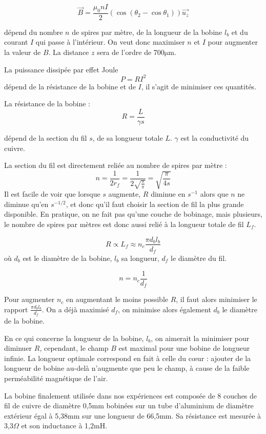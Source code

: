 \documentclass{report}
\newcommand{\micro}{$\mathrm{\mu}$}
\begin{document}
		$$ \vec{B} = \frac{\mu_0 n I}{2} \left(\cos \left(\theta_2 -\cos \theta_1 \right)\right) \vec{u_z}$$
		
		dépend du nombre $n$ de spires par mètre, de la longueur de la bobine $l_b$ et du courant $I$ qui passe à l'intérieur. On veut donc maximiser $n$ et $I$ pour augmenter la valeur de $B$. La distance $z$ sera de l'ordre de 700\micro m. 
		
		La puissance dissipée par effet Joule $$P = R I^2$$ dépend de la résistance de la bobine et de $I$, il s'agit de minimiser ces quantités.
		
		La résistance de la bobine : $$R = \frac{L}{\gamma s}$$
		
		dépend de la section du fil $s$, de sa longueur totale $L$. $\gamma$ est la conductivité du cuivre.  
		
		La section du fil est directement reliée au nombre de spires par mètre : $$ n = \frac{1}{2r_f} = \frac{1}{2 \sqrt{\frac{s}{\pi}}} = \sqrt{\frac{\pi}{4s}}$$  Il est facile de voir que lorsque $s$ augmente, $R$ diminue en $s^{-1}$ alors que $n$ ne diminue qu'en $s^{-1/2}$, et donc qu'il faut choisir la section de fil la plus grande disponible.
		En pratique, on ne fait pas qu'une couche de bobinage, mais plusieurs, le nombre de spires par mètres est donc aussi relié à la longueur totale de fil $L_f$.
		
		$$R \propto L_f \approx n_c \frac{\pi d_b l_b}{d_f}$$ où $d_b$ est le diamètre de la bobine, $l_b$ sa longueur, $d_f$ le diamètre du fil. 
		
		$$n = n_c \frac{1}{d_f}$$
		
		Pour augmenter $n_c$ en augmentant le moins possible $R$, il faut alors minimiser le rapport $\frac{\pi d_b l_b}{d_f}$. On a déjà maximisé $d_f$, on minimise alors également $d_b$ le diamètre de la bobine.
		
		En ce qui concerne la longueur de la bobine, $l_b$, on aimerait la minimiser pour diminuer $R$, cependant, le champ $B$ est maximal pour une bobine de longueur infinie. La longueur optimale correspond en fait à celle du c\oe ur : ajouter de la longueur de bobine au-delà n'augmente que peu le champ, à cause de la faible perméabilité magnétique de l'air.
		
		La bobine finalement utilisée dans nos expériences est composée de 8 couches de fil de cuivre de diamètre 0,5mm bobinées sur un tube d'aluminium de diamètre extérieur égal à 5,38mm sur une longueur de 66,5mm. Sa résistance est mesurée à 3,3$\Omega$ et son inductance à 1,2mH. 
		
\end{document}
